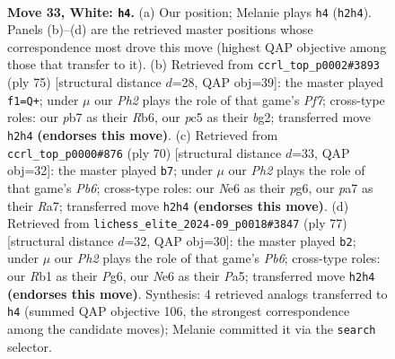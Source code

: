 \documentclass[11pt]{article}
\begin{document}
\clearpage

\begin{figure}[p]\centering
\begin{subfigure}{0.46\textwidth}\centering
\resizebox{\linewidth}{!}{%
\newchessgame
\chessboard[
  setfen={8/pp5R/k3N3/2p2p2/4p3/8/PPr3rP/1R1K4 w - - 4 33},
  showmover=false,
  pgfstyle=straightmove, color=movearrow, markmove={h2-h4}
]}
\caption{}
\end{subfigure}\hfill
\begin{subfigure}{0.46\textwidth}\centering
\resizebox{\linewidth}{!}{%
\newchessgame
\chessboard[
  setfen={3r1k2/6RR/1r4p1/1p6/8/PP6/2Pn1pBP/2K5 b - - 3 38},
  showmover=false,
  pgfstyle=straightmove, color=movearrow, markmove={f2-f1}
]}
\caption{}
\end{subfigure}
\\[4pt]
\begin{subfigure}{0.46\textwidth}\centering
\resizebox{\linewidth}{!}{%
\newchessgame
\chessboard[
  setfen={6k1/R4p1p/1P4p1/8/3P4/6P1/1r3r1P/3R2K1 w - - 0 36},
  showmover=false,
  pgfstyle=straightmove, color=movearrow, markmove={b6-b7}
]}
\caption{}
\end{subfigure}\hfill
\begin{subfigure}{0.46\textwidth}\centering
\resizebox{\linewidth}{!}{%
\newchessgame
\chessboard[
  setfen={6k1/1R3R1p/6p1/p7/P7/1p1r2PP/3n1P2/6K1 b - - 0 39},
  showmover=false,
  pgfstyle=straightmove, color=movearrow, markmove={b3-b2}
]}
\caption{}
\end{subfigure}
\caption{\textbf{Move 33, White: \texttt{h4}.} (a) Our position; Melanie plays \texttt{h4} (\texttt{h2h4}). Panels (b)--(d) are the retrieved master positions whose correspondence most drove this move (highest QAP objective among those that transfer to it). (b) Retrieved from \texttt{ccrl\_top\_p0002\#3893} (ply 75) [structural distance $d$=28, QAP obj=39]: the master played \texttt{f1=Q+}; under $\mu$ our \emph{Ph2} plays the role of that game's \emph{Pf7}; cross-type roles: our \emph{p}b7 as their \emph{R}b6, our \emph{p}c5 as their \emph{b}g2; transferred move \texttt{h2h4} \textbf{(endorses this move)}. (c) Retrieved from \texttt{ccrl\_top\_p0000\#876} (ply 70) [structural distance $d$=33, QAP obj=32]: the master played \texttt{b7}; under $\mu$ our \emph{Ph2} plays the role of that game's \emph{Pb6}; cross-type roles: our \emph{N}e6 as their \emph{p}g6, our \emph{p}a7 as their \emph{R}a7; transferred move \texttt{h2h4} \textbf{(endorses this move)}. (d) Retrieved from \texttt{lichess\_elite\_2024-09\_p0018\#3847} (ply 77) [structural distance $d$=32, QAP obj=30]: the master played \texttt{b2}; under $\mu$ our \emph{Ph2} plays the role of that game's \emph{Pb6}; cross-type roles: our \emph{R}b1 as their \emph{P}g6, our \emph{N}e6 as their \emph{P}a5; transferred move \texttt{h2h4} \textbf{(endorses this move)}. Synthesis: 4 retrieved analogs transferred to \texttt{h4} (summed QAP objective 106, the strongest correspondence among the candidate moves); Melanie committed it via the \texttt{search} selector.}
\label{fig:thought-m64}
\end{figure}
\end{document}
